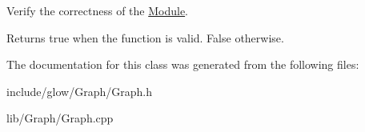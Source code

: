 Verify the correctness of the \hyperlink{classglow_1_1_module}{Module}. \begin{DoxyReturn}{Returns}
true when the function is valid. False otherwise. 
\end{DoxyReturn}


The documentation for this class was generated from the following files\+:\begin{DoxyCompactItemize}
\item 
include/glow/\+Graph/Graph.\+h\item 
lib/\+Graph/Graph.\+cpp\end{DoxyCompactItemize}
